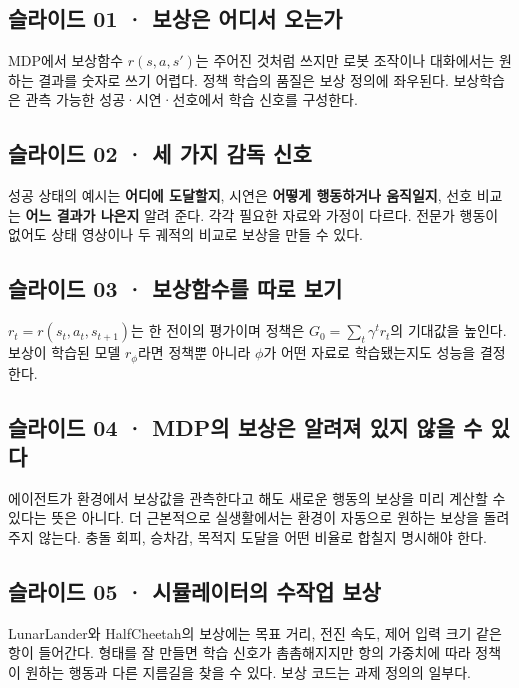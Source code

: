 \documentclass[11pt,a4paper]{article}
\begin{document}
\subsection{슬라이드 01 · 보상은 어디서 오는가}

MDP에서 보상함수 $r(s,a,s')$는 주어진 것처럼 쓰지만 로봇 조작이나 대화에서는 원하는 결과를 숫자로 쓰기 어렵다. 정책 학습의 품질은 보상 정의에 좌우된다. 보상학습은 관측 가능한 성공·시연·선호에서 학습 신호를 구성한다.\par

\subsection{슬라이드 02 · 세 가지 감독 신호}

성공 상태의 예시는 \textbf{어디에 도달할지}, 시연은 \textbf{어떻게 행동하거나 움직일지}, 선호 비교는 \textbf{어느 결과가 나은지} 알려 준다. 각각 필요한 자료와 가정이 다르다. 전문가 행동이 없어도 상태 영상이나 두 궤적의 비교로 보상을 만들 수 있다.\par

\subsection{슬라이드 03 · 보상함수를 따로 보기}

$r_t=r(s_t,a_t,s_{t+1})$는 한 전이의 평가이며 정책은 $G_0=\sum_t\gamma^t r_t$의 기대값을 높인다. 보상이 학습된 모델 $r_\phi$라면 정책뿐 아니라 $\phi$가 어떤 자료로 학습됐는지도 성능을 결정한다.\par

\subsection{슬라이드 04 · MDP의 보상은 알려져 있지 않을 수 있다}

에이전트가 환경에서 보상값을 관측한다고 해도 새로운 행동의 보상을 미리 계산할 수 있다는 뜻은 아니다. 더 근본적으로 실생활에서는 환경이 자동으로 원하는 보상을 돌려주지 않는다. 충돌 회피, 승차감, 목적지 도달을 어떤 비율로 합칠지 명시해야 한다.\par

\subsection{슬라이드 05 · 시뮬레이터의 수작업 보상}

LunarLander와 HalfCheetah의 보상에는 목표 거리, 전진 속도, 제어 입력 크기 같은 항이 들어간다. 형태를 잘 만들면 학습 신호가 촘촘해지지만 항의 가중치에 따라 정책이 원하는 행동과 다른 지름길을 찾을 수 있다. 보상 코드는 과제 정의의 일부다.\par
\end{document}
